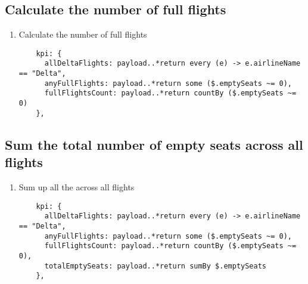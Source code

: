 \subsection{Calculate the number of full flights}
\begin{enumerate}[resume*]
\item Calculate the number of full flights
  \begin{verbatim}
    kpi: {
      allDeltaFlights: payload..*return every (e) -> e.airlineName == "Delta",
      anyFullFlights: payload..*return some ($.emptySeats ~= 0),
      fullFlightsCount: payload..*return countBy ($.emptySeats ~= 0)
    },
  \end{verbatim}
\end{enumerate}

\subsection{Sum the total number of empty seats across all flights}
\begin{enumerate}[resume*]
\item Sum up all the  across all flights
  \begin{verbatim}
    kpi: {
      allDeltaFlights: payload..*return every (e) -> e.airlineName == "Delta",
      anyFullFlights: payload..*return some ($.emptySeats ~= 0),
      fullFlightsCount: payload..*return countBy ($.emptySeats ~= 0),
      totalEmptySeats: payload..*return sumBy $.emptySeats
    },    
  \end{verbatim}
\end{enumerate}
